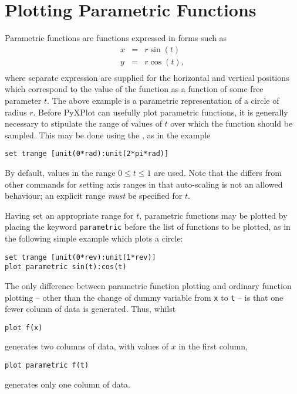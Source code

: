 \section{Plotting Parametric Functions}
\label{sec:parametric_plotting}

Parametric functions are functions expressed in forms such as
\begin{eqnarray*}
x & = & r \sin(t)  \\
y & = & r \cos(t) ,\\
\end{eqnarray*}
where separate expression are supplied for the horizontal and vertical
positions which correspond to the value of the function as a function of some
free parameter $t$. The above example is a parametric representation of a
circle of radius $r$. Before PyXPlot can usefully plot parametric functions, it
is generally necessary to stipulate the range of values of $t$ over which the
function should be sampled. This may be done using the , as
in the example
\begin{verbatim}
set trange [unit(0*rad):unit(2*pi*rad)]
\end{verbatim}
By default, values in the range $0\leq t\leq1$ are used. Note that the
 differs from other commands for setting axis ranges in
that auto-scaling is not an allowed behaviour; an explicit range {\it must} be
specified for $t$.

Having set an appropriate range for $t$, parametric functions may be plotted by
placing the keyword {\tt parametric} before the list of functions to be
plotted, as in the following simple example which plots a circle:
\begin{verbatim}
set trange [unit(0*rev):unit(1*rev)]
plot parametric sin(t):cos(t)
\end{verbatim}
The only difference between parametric function plotting and ordinary function
plotting -- other than the change of dummy variable from {\tt x} to {\tt t} --
is that one fewer column of data is generated. Thus, whilst
\begin{verbatim}
plot f(x)
\end{verbatim}
generates two columns of data, with values of $x$ in the first column,
\begin{verbatim}
plot parametric f(t)
\end{verbatim}
generates only one column of data.


